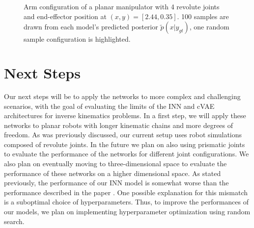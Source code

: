 \documentclass[conference]{IEEEtran}
\begin{document}
\begin{figure}[tbh]
\centering

    \caption{\label{fig:posterior:4dof} Arm configuration of a planar manipulator with 4 revolute joints and end-effector position at $(x, y) = [2.44, 0.35]$. 100 samples are drawn from each model's predicted posterior $\tilde{p}(x | y_{gt})$, one random sample configuration is highlighted.}
\end{figure}

\section*{Next Steps}

Our next steps will be to apply the networks to more complex and challenging scenarios, with the goal of evaluating the limits of the INN and cVAE architectures for inverse kinematics problems. In a first step, we will apply these networks to planar robots with longer kinematic chains and more degrees of freedom. As was previously discussed, our current setup uses robot simulations composed of revolute joints. In the future we plan on also using prismatic joints to evaluate the performance of the networks for different joint configurations. We also plan on eventually moving to three-dimensional space to evaluate the performance of these networks on a higher dimensional space. As stated previously, the performance of our INN model is somewhat worse than the performance described in the paper \cite{Ardizzone2018}. One possible explanation for this mismatch is a suboptimal choice of hyperparameters. Thus, to improve the performances of our models, we plan on implementing hyperparameter optimization using random search.

\nocite{*}


\end{document}

